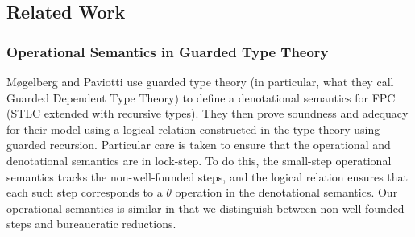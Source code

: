 \documentclass[acmsmall,screen,review,anonymous]{acmart}
\theoremstyle{remark}
\begin{document}



\subsection{Related Work}


\subsubsection{Operational Semantics in Guarded Type Theory}

Møgelberg and Paviotti \cite{mogelberg-paviotti2016} use guarded type theory (in
particular, what they call Guarded Dependent Type Theory) to define a
denotational semantics for FPC (STLC extended with recursive types). They then
prove soundness and adequacy for their model using a logical relation
constructed in the type theory using guarded recursion. Particular care is taken
to ensure that the operational and denotational semantics are in lock-step. To
do this, the small-step operational semantics tracks the non-well-founded steps,
and the logical relation ensures that each such step corresponds to a $\theta$
operation in the denotational semantics. Our operational semantics is similar in
that we distinguish between non-well-founded steps and bureaucratic reductions.

\end{document}
